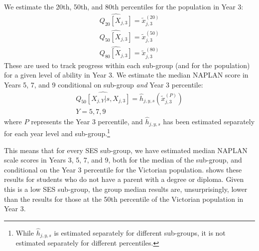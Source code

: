 We estimate the 20th, 50th, and 80th percentiles for the population in Year 3:
\begin{equation} \begin{array}{c}
\widehat{Q_{20}\left[X_{j,3}\right]} = \tilde{x}^{(20)}_{j,3} \\
\widehat{Q_{50}\left[X_{j,3}\right]} = \tilde{x}^{(50)}_{j,3} \\
\widehat{Q_{80}\left[X_{j,3}\right]} = \tilde{x}^{(80)}_{j,3}
\end{array} \end{equation}
These are used to track progress within each sub-group (and for the population) for a given level of ability in Year 3. We estimate the median NAPLAN score in Years 5, 7, and 9 conditional on sub-group \textit{and} Year 3 percentile:
\begin{equation} \begin{array}{c}
\widehat{Q_{50}\left[X_{j,Y}|s,X_{j,3}\right]} = \widehat{h}_{j,y,s}\left(\tilde{x}^{(P)}_{j,3}\right) \\
Y = 5,7,9
\end{array} \end{equation}
where $P$ represents the Year 3 percentile, and $\widehat{h}_{j,y,s}$ has been estimated separately for each year level and sub-group.\footnote{While $\widehat{h}_{j,y,s}$ is estimated separately for different sub-groups, it is not estimated separately for different percentiles.}

This means that for every SES sub-group, we have estimated median NAPLAN scale scores in Years 3, 5, 7, and 9, both for the median of the sub-group, and conditional on the Year 3 percentile for the Victorian population.  shows these results for students who do not have a parent with a degree or diploma. Given this is a low SES sub-group, the group median results are, unsurprisingly, lower than the results for those at the 50th percentile of the Victorian population in Year 3.

